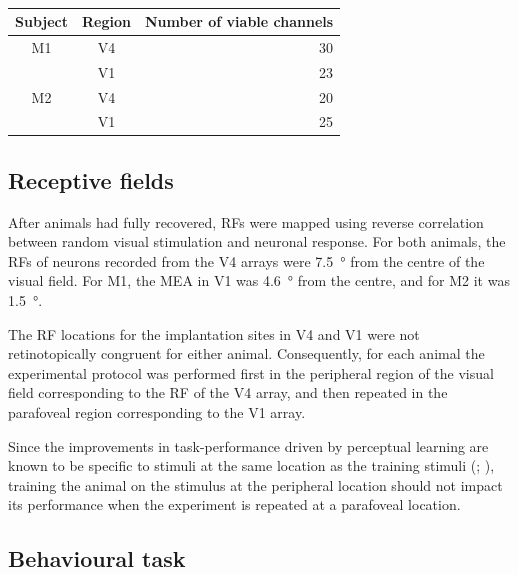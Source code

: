 \begin{table}[bthp]
\begin{center}
\begin{tabular}{ccr}
\toprule
Subject  & Region   & Number of viable channels \\
\midrule
\acs{M1} & \acs{V4} & \num{30} \\
         & \acs{V1} & \num{23} \\
\acs{M2} & \acs{V4} & \num{20} \\
         & \acs{V1} & \num{25} \\
\bottomrule
\end{tabular}
\end{center}
\caption{
}
\label{tab:nchannels}
\end{table}


\subsection{Receptive fields}

After animals had fully recovered, \acp{RF} were mapped using reverse correlation between random visual stimulation and neuronal response.
For both animals, the \acp{RF} of neurons recorded from the \ac{V4} arrays were \SI{7.5}{\degree} from the centre of the visual field.
For \ac{M1}, the \ac{MEA} in \ac{V1} was \SI{4.6}{\degree} from the centre, and for \ac{M2} it was \SI{1.5}{\degree}.

The \ac{RF} locations for the implantation sites in \ac{V4} and \ac{V1} were not retinotopically congruent for either animal.
Consequently, for each animal the experimental protocol was performed first in the peripheral region of the visual field corresponding to the \ac{RF} of the \ac{V4} array, and then repeated in the parafoveal region corresponding to the \ac{V1} array.

Since the improvements in task-performance driven by perceptual learning are known to be specific to stimuli at the same location as the training stimuli (\citealp{Fiorentini1980}; \citealp{Fiorentini1981,Poggio1991,Karni1991}), training the animal on the stimulus at the peripheral location should not impact its performance when the experiment is repeated at a parafoveal location.


\subsection{Behavioural task}
\label{sec:pl_task}

